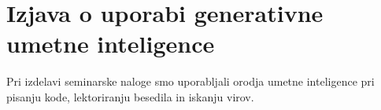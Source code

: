 \section*{Izjava o uporabi generativne umetne inteligence}

Pri izdelavi seminarske naloge smo uporabljali orodja umetne inteligence pri pisanju kode, lektoriranju besedila in iskanju virov.
